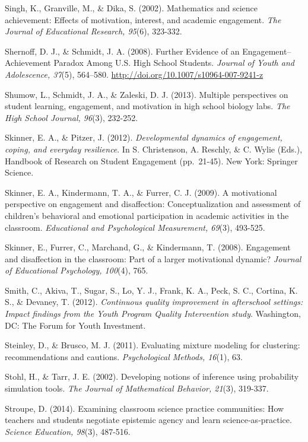 \documentclass[]{msu-thesis}
\theoremstyle{definition}
\theoremstyle{definition}
\theoremstyle{definition}
\theoremstyle{remark}
\begin{document}
Singh, K., Granville, M., \& Dika, S. (2002). Mathematics and science
achievement: Effects of motivation, interest, and academic engagement.
\emph{The Journal of Educational Research, 95}(6), 323-332.

Shernoff, D. J., \& Schmidt, J. A. (2008). Further Evidence of an
Engagement--Achievement Paradox Among U.S. High School Students.
\emph{Journal of Youth and Adolescence, 37}(5), 564--580.
\url{http://doi.org/10.1007/s10964-007-9241-z}

Shumow, L., Schmidt, J. A., \& Zaleski, D. J. (2013). Multiple
perspectives on student learning, engagement, and motivation in high
school biology labs. \emph{The High School Journal, 96}(3), 232-252.

Skinner, E. A., \& Pitzer, J. (2012). \emph{Developmental dynamics of
engagement, coping, and everyday resilience}. In S. Christenson, A.
Reschly, \& C. Wylie (Eds.), Handbook of Research on Student Engagement
(pp.~21-45). New York: Springer Science.

Skinner, E. A., Kindermann, T. A., \& Furrer, C. J. (2009). A
motivational perspective on engagement and disaffection:
Conceptualization and assessment of children's behavioral and emotional
participation in academic activities in the classroom. \emph{Educational
and Psychological Measurement, 69}(3), 493-525.

Skinner, E., Furrer, C., Marchand, G., \& Kindermann, T. (2008).
Engagement and disaffection in the classroom: Part of a larger
motivational dynamic? \emph{Journal of Educational Psychology, 100}(4),
765.

Smith, C., Akiva, T., Sugar, S., Lo, Y. J., Frank, K. A., Peck, S. C.,
Cortina, K. S., \& Devaney, T. (2012). \emph{Continuous quality
improvement in afterschool settings: Impact findings from the Youth
Program Quality Intervention study}. Washington, DC: The Forum for Youth
Investment.

Steinley, D., \& Brusco, M. J. (2011). Evaluating mixture modeling for
clustering: recommendations and cautions. \emph{Psychological Methods,
16}(1), 63.

Stohl, H., \& Tarr, J. E. (2002). Developing notions of inference using
probability simulation tools. \emph{The Journal of Mathematical
Behavior, 21}(3), 319-337.

Stroupe, D. (2014). Examining classroom science practice communities:
How teachers and students negotiate epistemic agency and learn
science‐as‐practice. \emph{Science Education, 98}(3), 487-516.
\end{document}
